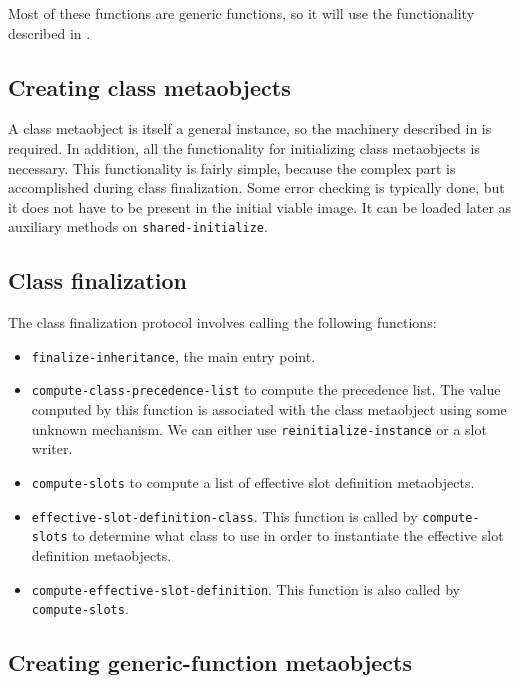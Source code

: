 Most of these functions are generic functions, so it will use the
functionality described in
.


\subsection{Creating class metaobjects}

A class metaobject is itself a general instance, so the machinery
described in  is
required.  In addition, all the functionality for initializing class
metaobjects is necessary.  This functionality is fairly simple,
because the complex part is accomplished during class finalization.
Some error checking is typically done, but it does not have to be
present in the initial viable image.  It can be loaded later as
auxiliary methods on \texttt{shared-initialize}.

\subsection{Class finalization}

The class finalization protocol involves calling the following
functions:

\begin{itemize}
\item \texttt{finalize-inheritance}, the main entry point.
\item \texttt{compute-class-precedence-list} to compute the
  precedence list.  The value computed by this function is associated
  with the class metaobject using some unknown mechanism.  We can
  either use \texttt{reinitialize-instance} or a slot writer.
\item \texttt{compute-slots} to compute a list of effective
  slot definition metaobjects.
\item \texttt{effective-slot-definition-class}.  This function is
  called by \texttt{compute-slots} to determine what class to use in
  order to instantiate the effective slot definition metaobjects.
\item \texttt{compute-effective-slot-definition}.  This function is
  also called by \texttt{compute-slots}.
\end{itemize}

\subsection{Creating generic-function metaobjects}

